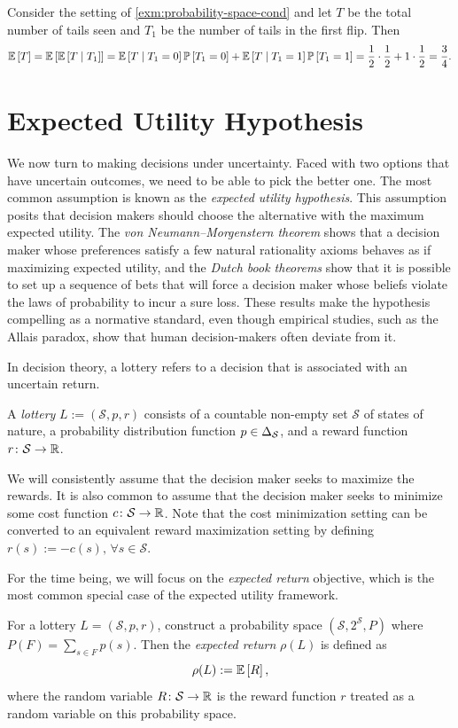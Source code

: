 \documentclass[letterpaper,11pt]{article}
\begin{document}
\begin{example}
  Consider the setting of \cref{exm:probability-space-cond} and let $T$ be the total number of tails seen and $T_1$ be the number of tails in the first flip. Then
  \[
    \mathbb{E}\left[ T  \right] =  \mathbb{E}\left[ \mathbb{E}\left[ T \mid  T_1 \right] \right]
    = \mathbb{E}\left[ T \mid  T_1 = 0 \right] \mathbb{P}\left[ T_1 = 0 \right] + \mathbb{E}\left[ T \mid  T_1 = 1 \right] \mathbb{P}\left[ T_1 = 1 \right]
    = \frac{1}{2} \cdot \frac{1}{2} + 1 \cdot \frac{1}{2} = \frac{3}{4}.
  \]
\end{example}

\section{Expected Utility Hypothesis}

We now turn to making decisions under uncertainty. Faced with two options that have uncertain outcomes, we need to be able to pick the better one. The most common assumption is known as the \emph{expected utility hypothesis}. This assumption posits that decision makers should choose the alternative with the maximum expected utility. The \emph{von Neumann–Morgenstern theorem} shows that a decision maker whose preferences satisfy a few natural rationality axioms behaves as if maximizing expected utility, and the \emph{Dutch book theorems} show that it is possible to set up a sequence of bets that will force a decision maker whose beliefs violate the laws of probability to incur a sure loss. These results make the hypothesis compelling as a normative standard, even though empirical studies, such as the Allais paradox, show that human decision-makers often deviate from it.  

In decision theory, a lottery refers to a decision that is associated with an uncertain return. 
\begin{defn}[Lottery]
A \emph{lottery} $L := (\mathcal{S}, p, r)$ consists of a countable non-empty set $\mathcal{S}$ of states of nature, a probability distribution function $p \in \Delta_{\mathcal{S}}$, and a reward function $r\colon \mathcal{S} \to \mathbb{R}$. 
\end{defn}
We will consistently assume that the decision maker seeks to maximize the rewards. It is also common to assume that the decision maker seeks to minimize some cost function $c\colon \mathcal{S} \to \mathbb{R}$. Note that the cost minimization setting can be converted to an equivalent reward maximization setting by defining $r(s) := -c(s), \, \forall s\in \mathcal{S}$.

For the time being, we will focus on the \emph{expected return} objective, which is the most common special case of the expected utility framework.
\begin{defn}
  For a lottery $L = (\mathcal{S}, p, r)$, construct a probability space $(\mathcal{S}, 2^{\mathcal{S}}, P)$ where $P(F) = \sum_{s\in F} p(s)$. Then the \emph{expected return} $\rho(L)$ is defined as
  \[
    \rho(L) := \mathbb{E}\left[ R \right],
  \]
  where the random variable $R\colon \mathcal{S} \to \mathbb{R}$ is the reward function $r$ treated as a random variable on this probability space.
\end{defn}
\end{document}
